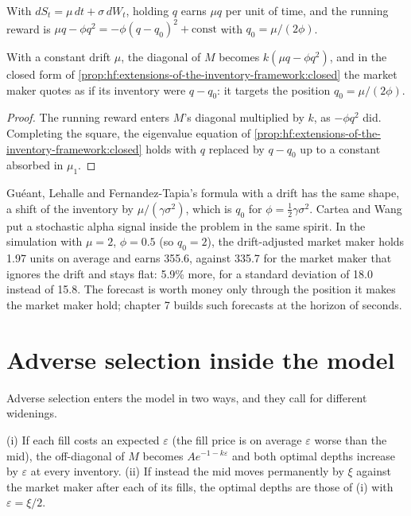 With $dS_t=\mu\,dt+\sigma\,dW_t$, holding $q$ earns $\mu q$ per unit of time, and the running reward is $\mu q-\phi q^2=-\phi(q-q_0)^2+\text{const}$ with
$q_0=\mu/(2\phi)$.

\begin{proposition}\label{prop:hf:extensions-of-the-inventory-framework:target}
With a constant drift $\mu$, the diagonal of $M$ becomes $k(\mu q-\phi q^2)$, and in the closed form of
\cref{prop:hf:extensions-of-the-inventory-framework:closed} the market maker quotes as if its inventory were $q-q_0$: it targets the position
$q_0=\mu/(2\phi)$.
\end{proposition}

\begin{proof}
The running reward enters $M$'s diagonal multiplied by $k$, as $-\phi q^2$ did. Completing the square, the eigenvalue equation of
\cref{prop:hf:extensions-of-the-inventory-framework:closed} holds with $q$ replaced by $q-q_0$ up to a constant absorbed in $\mu_1$.
\end{proof}

Guéant, Lehalle and Fernandez-Tapia's formula with a drift has the same shape, a shift of the inventory by $\mu/(\gamma\sigma^2)$, which is $q_0$ for
$\phi=\tfrac12\gamma\sigma^2$. Cartea and Wang put a stochastic alpha signal inside the problem in the same spirit. In the simulation with $\mu=2$,
$\phi=0.5$ (so $q_0=2$), the drift-adjusted market maker holds 1.97 units on average and earns 355.6, against 335.7 for the market maker that ignores the
drift and stays flat: 5.9\% more, for a standard deviation of 18.0 instead of 15.8. The forecast is worth money only through the position it makes
the market maker hold; chapter 7 builds such forecasts at the horizon of seconds.

\section{Adverse selection inside the model}

Adverse selection enters the model in two ways, and they call for different widenings.

\begin{proposition}\label{prop:hf:extensions-of-the-inventory-framework:adverse}
(i) If each fill costs an expected $\varepsilon$ (the fill price is on average $\varepsilon$ worse than the mid), the off-diagonal of $M$ becomes
$Ae^{-1-k\varepsilon}$ and both optimal depths increase by $\varepsilon$ at every inventory. (ii) If instead the mid moves permanently by $\xi$ against
the market maker after each of its fills, the optimal depths are those of (i) with $\varepsilon=\xi/2$.
\end{proposition}

